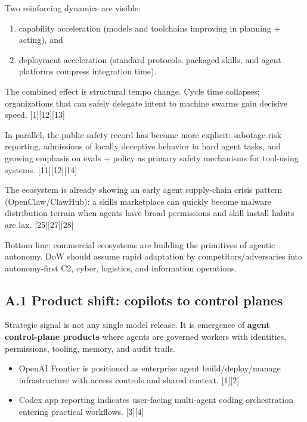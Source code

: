\documentclass[
]{article}
\providecommand{\tightlist}{%
  \setlength{\itemsep}{0pt}\setlength{\parskip}{0pt}}
\begin{document}
Two reinforcing dynamics are visible:

\begin{enumerate}
\def\labelenumi{\arabic{enumi}.}
\tightlist
\item
  capability acceleration (models and toolchains improving in planning +
  acting), and
\item
  deployment acceleration (standard protocols, packaged skills, and
  agent platforms compress integration time).
\end{enumerate}

The combined effect is structural tempo change. Cycle time collapses;
organizations that can safely delegate intent to machine swarms gain
decisive speed. {[}1{]}{[}12{]}{[}13{]}

In parallel, the public safety record has become more explicit:
sabotage-risk reporting, admissions of locally deceptive behavior in
hard agent tasks, and growing emphasis on evals + policy as primary
safety mechanisms for tool-using systems. {[}11{]}{[}12{]}{[}14{]}

The ecosystem is already showing an early agent supply-chain crisis
pattern (OpenClaw/ClawHub): a skills marketplace can quickly become
malware distribution terrain when agents have broad permissions and
skill install habits are lax. {[}25{]}{[}27{]}{[}28{]}

Bottom line: commercial ecosystems are building the primitives of
agentic autonomy. DoW should assume rapid adaptation by
competitors/adversaries into autonomy-first C2, cyber, logistics, and
information operations.

\hypertarget{a.1-product-shift-copilots-to-control-planes}{%
\subsection{A.1 Product shift: copilots to control
planes}\label{a.1-product-shift-copilots-to-control-planes}}

Strategic signal is not any single model release. It is emergence of
\textbf{agent control-plane products} where agents are governed workers
with identities, permissions, tooling, memory, and audit trails.

\begin{itemize}
\tightlist
\item
  OpenAI Frontier is positioned as enterprise agent build/deploy/manage
  infrastructure with access controls and shared context. {[}1{]}{[}2{]}
\item
  Codex app reporting indicates user-facing multi-agent coding
  orchestration entering practical workflows. {[}3{]}{[}4{]}
\end{itemize}
\end{document}
